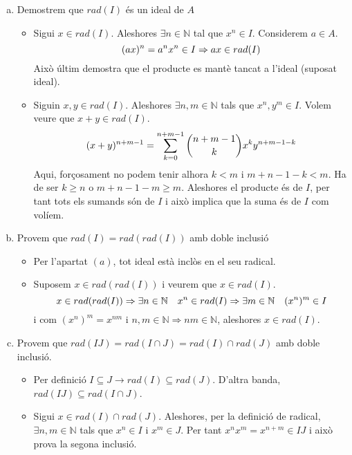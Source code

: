\documentclass[../main.tex]{subfiles}
\begin{document}
\begin{enumerate}[(a)]
    \item Demostrem que $rad(I)$ és un ideal de $A$
    \begin{itemize}
        \item Sigui $x\in rad(I)$. Aleshores $\exists n \in \mathbb{N}$ tal que $x^n\in I$. Considerem $a\in A$. 
        \begin{equation}
            \notag
            (ax)^n=a^nx^n\in I \Rightarrow ax\in rad(I)
        \end{equation}
        Això últim demostra que el producte es mantè tancat a l'ideal (suposat ideal).
        \item Siguin $x,y\in rad(I)$. Aleshores $\exists n,m\in \mathbb{N}$ tals que $x^n,y^m\in I$. Volem veure que $x+y\in rad(I)$.
        \begin{equation}
            \notag
            (x+y)^{n+m-1}=\displaystyle\sum_{k=0}^{n+m-1}\binom{n+m-1}{k}x^ky^{n+m-1-k}
        \end{equation}
        Aqui, forçosament no podem tenir alhora $k<m$ i $m+n-1-k<m$. Ha de ser $k \geq n$ o $m+n-1-m\geq m$. Aleshores el producte és de $I$, per tant tots els sumands són de $I$ i això implica que la suma és de $I$ com volíem.
    \end{itemize}
    
    \item Provem que $rad(I)=rad(rad(I))$ amb doble inclusió
    \begin{itemize}
        \item \fbox{$\subseteq$} Per l'apartat $(a)$, tot ideal està inclòs en el seu radical.
        \item \fbox{$\supseteq$} Suposem $x\in rad(rad(I))$ i veurem que $x\in rad(I)$.
        \begin{equation}
            \notag
            x\in rad(rad(I)) \Rightarrow \exists n\in \mathbb{N} \quad x^n\in rad(I) \Rightarrow \exists m\in \mathbb{N} \quad (x^n)^m \in I
        \end{equation}
        i com $(x^n)^m=x^{nm}$ i $n,m\in \mathbb{N}\Rightarrow nm\in \mathbb{N}$, aleshores $x\in rad(I)$.
    \end{itemize}
    
    \item Provem que $rad(IJ)=rad(I\cap J)=rad(I)\cap rad(J)$ amb doble inclusió.
    \begin{itemize}
        \item \fbox{$\subseteq$} Per definició $I\subseteq J\longrightarrow rad(I)\subseteq rad(J)$. D'altra banda, $rad(IJ)\subseteq rad(I\cap J)$.
        \item \fbox{$\supseteq$} Sigui $x\in rad(I)\cap rad(J)$. Aleshores, per la definició de radical, $\exists n,m\in \mathbb{N}$ tals que $x^n\in I$ i $x^m\in J$. Per tant $x^nx^m=x^{n+m}\in IJ$ i això prova la segona inclusió.
    \end{itemize}
    

\end{enumerate}
\end{document}
